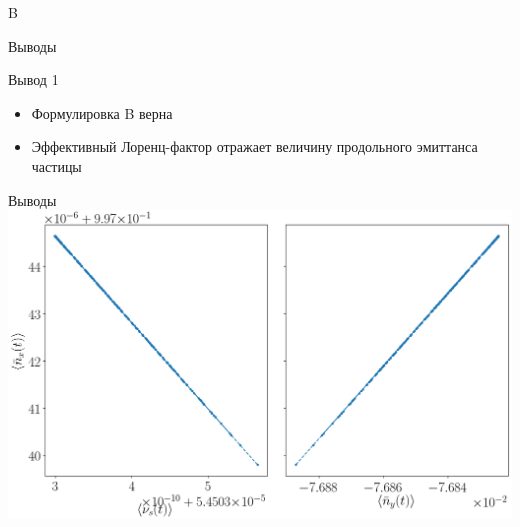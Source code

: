 \documentclass[14pt]{beamer}
\begin{document}
\begin{frame}{B}
\hspace*{-2cm}
\end{frame}
\begin{frame}{Выводы}
	\begin{block}{Вывод 1}
		\begin{itemize}[<+->]
			\item Формулировка B верна
			\item Эффективный Лоренц-фактор отражает величину продольного эмиттанса частицы
		\end{itemize}
	\end{block}
\end{frame}
\begin{frame}{Выводы}\centering
	\includegraphics[width=.9\linewidth]{decoh_sim/mean_n_bar_vs_spin_tune}
\end{frame}
\end{document}
